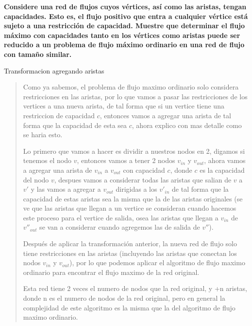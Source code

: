 \textbf{
    Considere una red de flujos cuyos vértices, así como las aristas, tengan capacidades. Esto es, el flujo positivo que entra a cualquier vértice está sujeto a una restricción de capacidad. Muestre que determinar el flujo máximo con capacidades tanto en los vértices
    como aristas puede ser reducido a un problema de flujo máximo ordinario en una red de flujo con tamaño similar.
}\vspace{.2cm}

\textcolor{bibi}{Transformacion agregando aristas}
\begin{quote}
    Como ya sabemos, el problema de flujo maximo ordinario solo considera restricciones en las aristas, por lo que vamos a pasar las restricciones de los vertices a una nueva arista, de tal forma que si un vertice tiene una restriccion de capacidad $c$, entonces vamos a agregar una arista de tal forma que la capacidad de esta sea $c$, ahora explico con mas detalle como se haria esto. \vspace{.2cm}

    Lo primero que vamos a hacer es dividir a nuestros nodos en 2, digamos si tenemos el nodo $v$, entonces vamos a tener 2 nodos $v_{in}$ y $v_{out}$, ahora vamos a agregar una arista de $v_{in}$ a $v_{out}$ con capacidad $c$, donde $c$ es la capacidad del nodo $v$, despues vamos a considerar todas las aristas que salian de $v$ a $v'$ y las vamos a agregar a $v_{out}$ dirigidas a los $v'_{in}$ de tal forma que la capacidad de estas aristas sea la misma que la de las aristas originales (se ve que las aristas que llegan a un vertice se consideran cuando hacemos este proceso para el vertice de salida, osea las aristas que llegan a $v_{in}$ de $v''_{out}$ se van a considerar cuando agregemos las de salida de $v''$). \vspace{.2cm} 

    Después de aplicar la transformación anterior, la nueva red de flujo solo tiene restricciones en las aristas (incluyendo las aristas que conectan los nodos $v_{in}$ y $v_{out}$), por lo que podemos aplicar el algoritmo de flujo maximo ordinario para encontrar el flujo maximo de la red original.\vspace{.2cm} 

    Esta red tiene 2 veces el numero de nodos que la red original, y +n aristas, donde n es el numero de nodos de la red original, pero en general la complejidad de este algoritmo es la misma que la del algoritmo de flujo maximo ordinario. \vspace{.3cm} 
\end{quote}